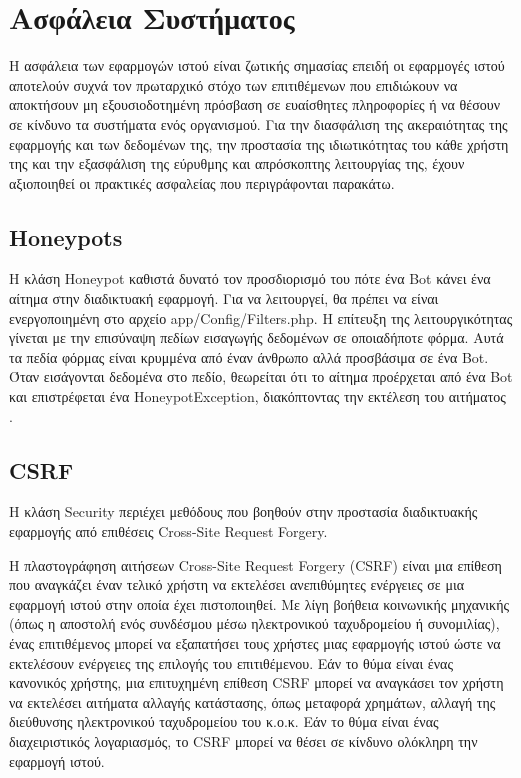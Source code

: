 \section{Ασφάλεια Συστήματος}
Η ασφάλεια των εφαρμογών ιστού είναι ζωτικής σημασίας επειδή οι εφαρμογές ιστού αποτελούν συχνά τον πρωταρχικό στόχο των επιτιθέμενων που επιδιώκουν να αποκτήσουν μη εξουσιοδοτημένη πρόσβαση σε ευαίσθητες πληροφορίες ή να θέσουν σε κίνδυνο τα συστήματα ενός οργανισμού. Για την διασφάλιση της ακεραιότητας της εφαρμογής και των δεδομένων της, την προστασία της ιδιωτικότητας του κάθε χρήστη της και την εξασφάλιση της εύρυθμης και απρόσκοπτης λειτουργίας της, έχουν αξιοποιηθεί οι πρακτικές ασφαλείας που περιγράφονται παρακάτω.

\subsection{Honeypots}
Η κλάση Honeypot καθιστά δυνατό τον προσδιορισμό του πότε ένα Bot κάνει ένα αίτημα στην διαδικτυακή εφαρμογή. Για να λειτουργεί, θα πρέπει να είναι ενεργοποιημένη στο αρχείο app/Config/Filters.php. Η επίτευξη της λειτουργικότητας γίνεται με την επισύναψη πεδίων εισαγωγής δεδομένων σε οποιαδήποτε φόρμα. Αυτά τα πεδία φόρμας είναι κρυμμένα από έναν άνθρωπο αλλά προσβάσιμα σε ένα Bot. Όταν εισάγονται δεδομένα στο πεδίο, θεωρείται ότι το αίτημα προέρχεται από ένα Bot και επιστρέφεται ένα HoneypotException, διακόπτοντας την εκτέλεση του αιτήματος \cite{CodeIgniter_honeypots}.

\subsection{CSRF}
Η κλάση Security περιέχει μεθόδους που βοηθούν στην προστασία διαδικτυακής εφαρμογής από επιθέσεις Cross-Site Request Forgery.

Η πλαστογράφηση αιτήσεων Cross-Site Request Forgery (CSRF) είναι μια επίθεση που αναγκάζει έναν τελικό χρήστη να εκτελέσει ανεπιθύμητες ενέργειες σε μια εφαρμογή ιστού στην οποία έχει πιστοποιηθεί. Με λίγη βοήθεια κοινωνικής μηχανικής (όπως η αποστολή ενός συνδέσμου μέσω ηλεκτρονικού ταχυδρομείου ή συνομιλίας), ένας επιτιθέμενος μπορεί να εξαπατήσει τους χρήστες μιας εφαρμογής ιστού ώστε να εκτελέσουν ενέργειες της επιλογής του επιτιθέμενου. Εάν το θύμα είναι ένας κανονικός χρήστης, μια επιτυχημένη επίθεση CSRF μπορεί να αναγκάσει τον χρήστη να εκτελέσει αιτήματα αλλαγής κατάστασης, όπως μεταφορά χρημάτων, αλλαγή της διεύθυνσης ηλεκτρονικού ταχυδρομείου του κ.ο.κ. Εάν το θύμα είναι ένας διαχειριστικός λογαριασμός, το CSRF μπορεί να θέσει σε κίνδυνο ολόκληρη την εφαρμογή ιστού.

